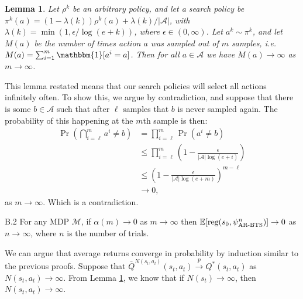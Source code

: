 \documentclass{article}
\newcommand{\crtodo}[1]{}
\newcommand{\bb}[1]{\mathbb{#1}}
\newcommand{\cl}[1]{\mathcal{#1}}
\newcommand{\reg}{\textnormal{reg}}
\newcommand{\one}{\mathbbm{1}}
\newcommand{\rap}{\overset{p}{\to}}
\theoremstyle{plain}
\newtheorem{lemma}[theorem]{Lemma}
\newenvironment{proofoutline}{\proof[Proof outline]}{\endproof}
\begin{document}
\begin{appendices}
        \begin{lemma} \label{lem:inf_often_action_select}
            Let $\rho^k$ be an arbitrary policy, and let a search policy be $\pi^k(a)=(1-\lambda(k))\rho^k(a) + \lambda(k) / |\cl{A}|$, with $\lambda(k)=\min(1,\epsilon/\log(e+k))$, where $\epsilon\in(0,\infty)$. Let $a^k\sim \pi^k$, and let $M(a)$ be the number of times action $a$ was sampled out of $m$ samples, i.e. $M(a)=\sum_{i=1}^m \one[a^i=a]$. Then for all $a\in\cl{A}$ we have $M(a)\rightarrow\infty$ as $m\rightarrow \infty$.
        \end{lemma}
        \begin{proofoutline}
            This lemma restated means that our search policies will select all actions infinitely often. To show this, we argue by contradiction, and suppose that there is some $b\in\cl{A}$ such that after $\ell$ samples that $b$ is never sampled again. The probability of this happening at the $m$th sample is then:
            \begin{align}
                \Pr\left(\bigcap_{i=\ell}^m a^i \neq b \right)
                    &= \prod_{i=\ell}^m \Pr(a^i \neq b) \\
                    &\leq \prod_{i=\ell}^m \left( 1 - \frac{\epsilon}{|\cl{A}|\log(e+i)} \right) \\
                    &\leq \left( 1 - \frac{\epsilon}{|\cl{A}|\log(e+m)} \right)^{m-\ell} \\
                    &\rightarrow 0,
            \end{align}
            as $m\rightarrow\infty$. Which is a contradiction. 
            \crtodo{Actually show the limit is zero using some convergence result. Also explain the maths a bit more. Also be more precise around the use of epsilon}
        \end{proofoutline}





        
        
        \begin{customthm}{B.2} %
            For any MDP $\cl{M}$, if $\alpha(m)\rightarrow 0$ as $m\rightarrow\infty$ then $\bb{E}[\reg(s_0,\psi^n_{\textnormal{AR-BTS}})]\rightarrow 0$ as $n\rightarrow\infty$, where $n$ is the number of trials.
        \end{customthm}
        \begin{proofoutline}
            We can argue that average returns converge in probability by induction similar to the previous proofs. Suppose that $\bar{Q}^{N(s_t,a_t)}(s_t, a_t) \rap Q^*(s_t,a_t)$ as $N(s_t,a_t)\rightarrow\infty$. From Lemma \ref{lem:inf_often_action_select}, we know that if $N(s_t)\rightarrow\infty$, then $N(s_t,a_t)\rightarrow\infty$.


\end{proofoutline}
\end{appendices}
\end{document}
